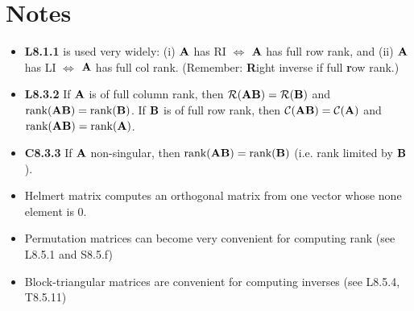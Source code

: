 \documentclass[a4paper, oneside]{book}
\begin{document}
\section*{Notes}
\begin{itemize}
\item \textbf{L8.1.1} is used very widely: (i) $\mathbf A$ has RI $\iff$ $\mathbf A$ has full row rank, and (ii) $\mathbf A$ has LI $\iff$ $\mathbf A$ has full col rank. (Remember: \textbf{R}ight inverse if full \textbf{r}ow rank.)
\item \textbf{L8.3.2} If $\mathbf A$ is of full column rank, then $\mathcal{R}(\mathbf{AB})=\mathcal{R}(\mathbf B)$ and $\text{rank}(\mathbf{AB})=\text{rank}(\mathbf B)$. If $\mathbf{B}$ is of full row rank, then $\mathcal{C}(\mathbf{AB})=\mathcal{C}(\mathbf A)$ and $\text{rank}(\mathbf{AB})=\text{rank}(\mathbf{A})$.
\item \textbf{C8.3.3} If $\mathbf A$ non-singular, then $\text{rank}(\mathbf{AB})=\text{rank}(\mathbf B)$ (i.e. rank limited by $\mathbf B$). 
\item Helmert matrix computes an orthogonal matrix from one vector whose none element is $0$.
\item Permutation matrices can become very convenient for computing rank (see L8.5.1 and S8.5.f)
\item Block-triangular matrices are convenient for computing inverses (see L8.5.4, T8.5.11)
\end{itemize}
\end{document}
